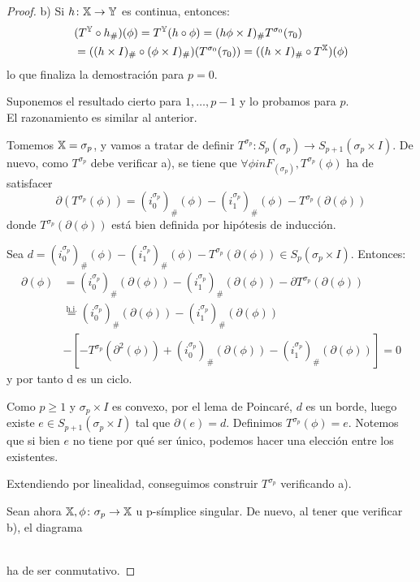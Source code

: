 \begin{proof}
  b) Si $h \colon {\mathbb X} \to {\mathbb Y}$ es continua, entonces:
  \begin{align*}
    &(T^{\mathbb Y} \circ h_\#)(\phi) = T^{\mathbb Y}(h \circ \phi) = (h\phi \times I)_\# T^{\sigma_0}(\tau_0) \\
    &= ((h \times I)_\# \circ (\phi \times I)_\#) (T^{\sigma_0}(\tau_0)) = ((h \times I)_\# \circ T^{\mathbb X})(\phi)
  \end{align*}
  lo que finaliza la demostración para $p = 0$.

  Suponemos el resultado cierto para $1, \dots, p-1$ y lo probamos para $p$. \\
  El razonamiento es similar al anterior.

  Tomemos ${\mathbb X} = \sigma_p$, y vamos a tratar de definir $T^{\sigma_p} \colon S_p(\sigma_p) \to S_{p+1}(\sigma_p \times I)$.
  De nuevo, como $T^{\sigma_p}$ debe verificar a), se tiene que $\forall \phi in F_(\sigma_p), T^{\sigma_p}(\phi)$ ha de satisfacer
  \[ \partial(T^{\sigma_p}(\phi)) = (i_0^{\sigma_p})_\# (\phi) - (i_1^{\sigma_p})_\# (\phi) - T^{\sigma_p}(\partial(\phi)) \]
  donde $T^{\sigma_p}(\partial(\phi))$ está bien definida por hipótesis de inducción.

  Sea $d = (i_0^{\sigma_p})_\# (\phi) - (i_1^{\sigma_p})_\# (\phi) - T^{\sigma_p}(\partial(\phi)) \in S_p(\sigma_p \times I)$.
  Entonces:
  \begin{align*}
    \partial(\phi) &= (i_0^{\sigma_p})_\# (\partial(\phi)) - (i_1^{\sigma_p})_\# (\partial(\phi)) - \partial T^{\sigma_p}(\partial(\phi)) \\
                   &\stackrel{\text{h.i.}}{=} (i_0^{\sigma_p})_\#(\partial(\phi)) - (i_1^{\sigma_p})_\#(\partial(\phi)) \\
                   &- [ - T^{\sigma_p}(\partial^2(\phi)) + (i_0^{\sigma_p})_\#(\partial(\phi)) - (i_1^{\sigma_p})_\#(\partial(\phi)) ] = 0
  \end{align*}
  y por tanto d es un ciclo.

  Como $p \geq 1$ y $\sigma_p \times I$ es convexo, por el lema de Poincaré, $d$ es un borde, luego existe $e \in S_{p+1}(\sigma_p \times I)$
  tal que $\partial(e) = d$. Definimos $T^{\sigma_p}(\phi) = e$. Notemos que si bien $e$ no tiene por qué ser único, podemos hacer una elección
  entre los existentes.

  Extendiendo por linealidad, conseguimos construir $T^{\sigma_p}$ verificando a).

  Sean ahora ${\mathbb X}, \phi \colon \sigma_p \to {\mathbb X}$ u p-símplice singular. De nuevo, al tener que verificar b), el diagrama \\
   \\
  ha de ser conmutativo.


\end{proof}
